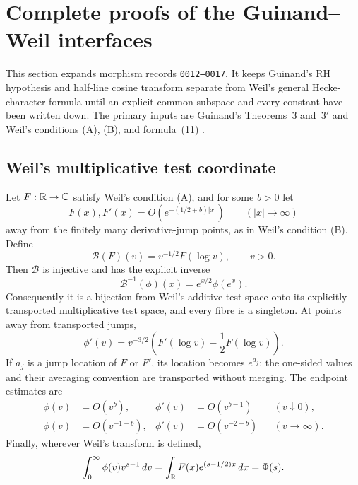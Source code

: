 \section{Complete proofs of the Guinand--Weil interfaces}
\label{sec:complete-guinand-weil-proofs}

This section expands morphism records \texttt{0012--0017}.  It keeps
Guinand's RH hypothesis and half-line cosine transform separate from Weil's
general Hecke-character formula until an explicit common subspace and every
constant have been written down.  The primary inputs are Guinand's
Theorems~3 and~$3'$ and Weil's conditions (A), (B), and formula~(11)
\cite[pp.~112--115]{guinand1948}
\cite[Collected Papers II, pp.~52--58]{weil1952}.

\subsection{Weil's multiplicative test coordinate}

\begin{theorem}
\label{thm:weil-log-mellin-bijection-complete}
Let $F:\mathbb R\to\mathbb C$ satisfy Weil's condition (A), and for some $b>0$ let
\begin{equation}
 F(x),F'(x)=O\!\left(e^{-(1/2+b)|x|}\right)
 \qquad(|x|\to\infty)
 \label{eq:weil-B-restated}
\end{equation}
away from the finitely many derivative-jump points, as in Weil's condition
(B).  Define
\begin{equation}
 \mathcal B(F)(v)=v^{-1/2}F(\log v),\qquad v>0.
 \label{eq:B-map-complete}
\end{equation}
Then $\mathcal B$ is injective and has the explicit inverse
\begin{equation}
 \mathcal B^{-1}(\phi)(x)=e^{x/2}\phi(e^x).
 \label{eq:B-inverse-complete}
\end{equation}
Consequently it is a bijection from Weil's additive test space onto its
explicitly transported multiplicative test space, and every fibre is a
singleton.  At points away from transported jumps,
\begin{equation}
 \phi'(v)=v^{-3/2}
 \left(F'(\log v)-\frac12F(\log v)\right).
 \label{eq:B-derivative-complete}
\end{equation}
If $a_j$ is a jump location of $F$ or $F'$, its location becomes $e^{a_j}$;
the one-sided values and their averaging convention are transported without
merging.  The endpoint estimates are
\begin{align}
 \phi(v)&=O(v^b),&\phi'(v)&=O(v^{b-1})&&(v\downarrow0),\label{eq:B-zero-decay}\\
 \phi(v)&=O(v^{-1-b}),&\phi'(v)&=O(v^{-2-b})&&(v\to\infty).
 \label{eq:B-infinity-decay}
\end{align}
Finally, wherever Weil's transform is defined,
\begin{equation}
 \int_0^\infty \phi(v)v^{s-1}\,dv
 =\int_\mathbb R F(x)e^{(s-1/2)x}\,dx=\Phi(s).
 \label{eq:B-mellin-complete}
\end{equation}
\end{theorem}

